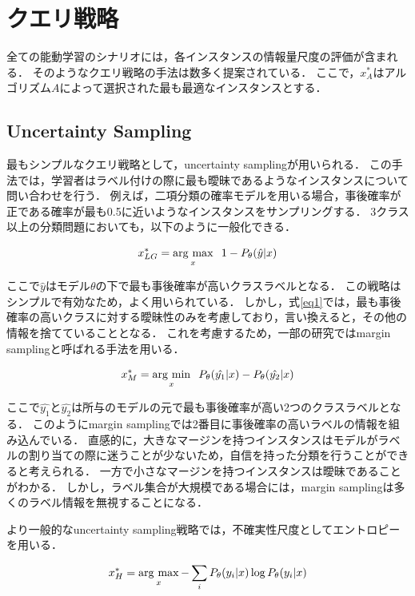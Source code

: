 \documentclass[11pt]{report}
\newcommand{\argmax}{\mathop{\rm arg~max}\limits}
\newcommand{\argmin}{\mathop{\rm arg~min}\limits}
\begin{document}
\section{クエリ戦略}
全ての能動学習のシナリオには，各インスタンスの情報量尺度の評価が含まれる．
そのようなクエリ戦略の手法は数多く提案されている．
ここで，$x_A^*$はアルゴリズム$A$によって選択された最も最適なインスタンスとする．

\subsection{Uncertainty Sampling}
最もシンプルなクエリ戦略として，uncertainty samplingが用いられる．
この手法では，学習者はラベル付けの際に最も曖昧であるようなインスタンスについて問い合わせを行う．
例えば，二項分類の確率モデルを用いる場合，事後確率が正である確率が最も0.5に近いようなインスタンスをサンプリングする．
3クラス以上の分類問題においても，以下のように一般化できる．

\begin{equation}
\label{eq1}
    x_{LG}^* = \argmax_{x} \;\; 1 - P_{\theta}(\hat{y}|x)
\end{equation}

ここで$\hat{y}$はモデル$\theta$の下で最も事後確率が高いクラスラベルとなる．
この戦略はシンプルで有効なため，よく用いられている．
しかし，式\ref{eq1}では，最も事後確率の高いクラスに対する曖昧性のみを考慮しており，言い換えると，その他の情報を捨てていることとなる．
これを考慮するため，一部の研究ではmargin samplingと呼ばれる手法を用いる．

\begin{equation}
\label{eq2}
    x_M^* = \argmin_{x} \;\; P_{\theta}(\hat{y_1}|x) - P_{\theta}(\hat{y_2}|x)
\end{equation}

ここで$\hat{y_1}$と$\hat{y_2}$は所与のモデルの元で最も事後確率が高い2つのクラスラベルとなる．
このようにmargin samplingでは2番目に事後確率の高いラベルの情報を組み込んでいる．
直感的に，大きなマージンを持つインスタンスはモデルがラベルの割り当ての際に迷うことが少ないため，自信を持った分類を行うことができると考えられる．
一方で小さなマージンを持つインスタンスは曖昧であることがわかる．
しかし，ラベル集合が大規模である場合には，margin samplingは多くのラベル情報を無視することになる．

より一般的なuncertainty sampling戦略では，不確実性尺度としてエントロピーを用いる．

\begin{equation}
    x_H^* = \argmax_{x} - \sum_{i} P_{\theta}(y_i|x) \log P_{\theta}(y_i|x)
\end{equation}
\end{document}
